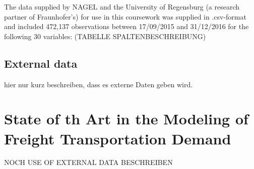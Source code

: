 \documentclass[a4paper, 11pt]{article}
\begin{document}
The data supplied by NAGEL and the University of Regensburg (a research partner of Fraunhofer's) for use in this coursework was supplied in .csv-format and included 472,137 observations between 17/09/2015 and 31/12/2016 for the following 30 variables:
(TABELLE SPALTENBESCHREIBUNG)
\\

\subsection{External data}
hier nur kurz beschreiben, dass es externe Daten geben wird.

\section{State of th Art in the Modeling of Freight Transportation Demand}

NOCH USE OF EXTERNAL DATA BESCHREIBEN
\end{document}
